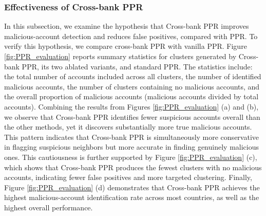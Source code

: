 \subsubsection{Effectiveness of Cross-bank PPR}
In this subsection, we examine the hypothesis that Cross-bank PPR improves malicious-account detection and reduces false positives, compared with PPR. To verify this hypothesis, we compare cross-bank PPR with vanilla PPR. Figure \ref{fig:PPR_evaluation} reports summary statistics for clusters generated by Cross-bank PPR, its two ablated variants, and standard PPR. The statistics include: the total number of accounts included across all clusters, the number of identified malicious accounts, the number of clusters containing no malicious accounts, and the overall proportion of malicious accounts (malicious accounts divided by total accounts).
Combining the results from Figures \ref{fig:PPR_evaluation} (a) and (b), we observe that Cross-bank PPR identifies fewer suspicious accounts overall than the other methods, yet it discovers substantially more true malicious accounts. This pattern indicates that Cross-bank PPR is simultaneously more conservative in flagging suspicious neighbors but more accurate in finding genuinely malicious ones. This cautiousness is further supported by Figure \ref{fig:PPR_evaluation} (c), which shows that Cross-bank PPR produces the fewest clusters with no malicious accounts, indicating fewer false positives and more targeted clustering. Finally, Figure \ref{fig:PPR_evaluation} (d) demonstrates that Cross-bank PPR achieves the highest malicious-account identification rate across most countries, as well as the highest overall performance.

